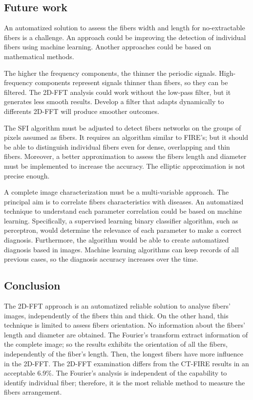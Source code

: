 \documentclass[12pt,a4paper]{article}
\begin{document}
\subsection{Future work}
An automatized solution to assess the fibers width and length for no-extractable fibers is a challenge. An approach could be improving the detection of individual fibers using machine learning. Another approaches could be based on mathematical methods. 

The higher the frequency components, the thinner the periodic signals. High-frequency components represent signals thinner than fibers, so they can be filtered. The 2D-FFT analysis could work without the low-pass filter, but it generates less smooth results.   Develop a filter that adapts dynamically to differents 2D-FFT will produce smoother outcomes.

The SFI algorithm must be adjusted to detect fibers networks on the groups of pixels assumed as fibers. It requires an algorithm similar to FIRE's; but it should be able to distinguish individual fibers even for dense, overlapping and thin fibers. Moreover, a better approximation to assess the fibers length and diameter must be implemented to increase the accuracy. The elliptic approximation is not precise enough.

A complete image characterization must be a multi-variable approach. The principal aim is to correlate fibers characteristics with diseases. An automatized technique to understand each parameter correlation could be based on machine learning. Specifically, a supervised learning binary classifier algorithm, such as perceptron, would determine the relevance of each parameter to make a correct diagnosis. Furthermore, the algorithm would be able to create automatized diagnosis based in images. Machine learning algorithms can keep records of all  previous cases, so the diagnosis accuracy increases over the time. 

\subsection{Conclusion}
The 2D-FFT approach is an automatized reliable solution to analyse fibers' images, independently of the fibers thin and thick. On the other hand, this technique is limited to assess fibers orientation. No information about the fibers' length and diameter are obtained. The Fourier's transform extract information of the complete image; so the results exhibits the orientation of all the fibers, independently of the fiber's length. Then, the longest fibers have more influence in the 2D-FFT. The 2D-FFT examination differs from the CT-FIRE results in an acceptable 6.9\%. The Fourier's analysis is independent of the capability to identify individual fiber; therefore, it is the most reliable method to measure the fibers arrangement.
\end{document}
